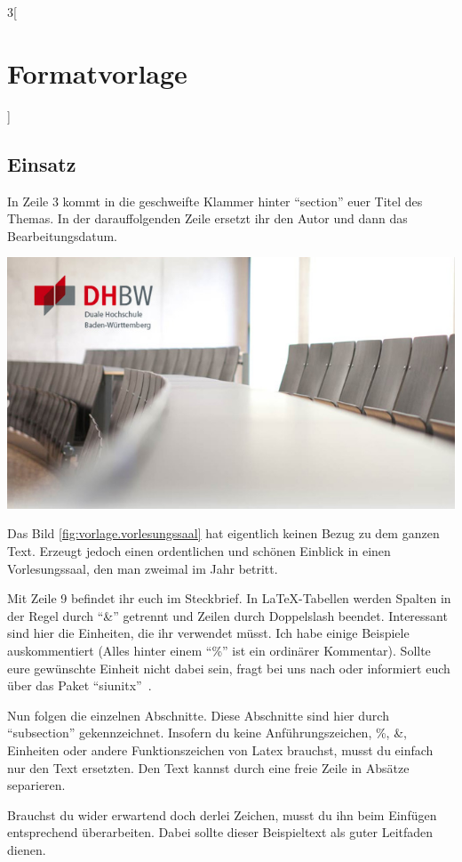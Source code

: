 \begin{multicols}{3}[\section{Formatvorlage}]
\subsection*{Einsatz}
In Zeile 3 kommt in die geschweifte Klammer hinter \enquote{section} euer Titel des Themas. In der darauffolgenden Zeile ersetzt ihr den Autor und dann das Bearbeitungsdatum.
\begin{Figure}
\includegraphics[width=\linewidth]{Kapitel/Vorlage/Grafiken/bild2_dhbw.jpg}
\label{fig:vorlage.vorlesungssaal}
\end{Figure}
Das Bild \ref{fig:vorlage.vorlesungssaal} hat eigentlich keinen Bezug zu dem ganzen Text. Erzeugt jedoch einen ordentlichen und schönen Einblick in einen Vorlesungssaal, den man zweimal im Jahr betritt.

Mit Zeile 9 befindet ihr euch im Steckbrief. In \LaTeX-Tabellen werden Spalten in der Regel durch \enquote{\&} getrennt und Zeilen durch Doppelslash beendet. Interessant sind hier die Einheiten, die ihr verwendet müsst. Ich habe einige Beispiele auskommentiert (Alles hinter einem \enquote{\%} ist ein ordinärer Kommentar). Sollte eure gewünschte Einheit nicht dabei sein, fragt bei uns nach oder informiert euch über das Paket \enquote{siunitx}~\cite{vorlage.1}.

Nun folgen die einzelnen Abschnitte. Diese Abschnitte sind hier durch \enquote{subsection} gekennzeichnet. Insofern du keine Anführungszeichen, \%, \&, Einheiten oder andere Funktionszeichen von Latex brauchst, musst du einfach nur den Text ersetzten. Den Text kannst durch eine freie Zeile in Absätze separieren. 

Brauchst du wider erwartend doch derlei Zeichen, musst du ihn beim Einfügen entsprechend überarbeiten. Dabei sollte dieser Beispieltext als guter Leitfaden dienen.


\end{multicols}
